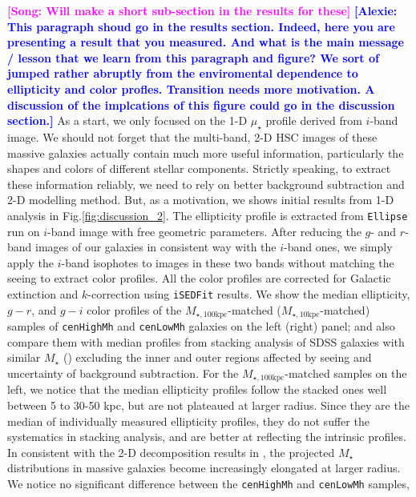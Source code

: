 \documentclass{emulateapj}
\def\rbcg{\texttt{cenHighMh}}
\def\nbcg{\texttt{cenLowMh}}
\def\mstar{{$M_{\star}$}}
\def\minn{{$M_{\star,10\mathrm{kpc}}$}}
\def\mtot{{$M_{\star,100\mathrm{kpc}}$}}
\def\mden{{$\mu_{\star}$}}
\newcommand{\song}[1]{\textcolor{magenta}{\textbf{[Song: #1]}}}
\newcommand{\alexie}[1]{\textcolor{blue}{\textbf{[Alexie: #1]}}}
\begin{document}
\begin{CJK*}{UTF8}{gbsn}
    \song{Will make a short sub-section in the results for these}
\alexie{This paragraph shoud go in the results section. Indeed, here you are presenting a result that you measured. And what is the main message / lesson that we learn from this paragraph and figure? We sort of jumped rather abruptly from the enviromental dependence to ellipticity and color profles. Transition needs more motivation. A discussion of the implcations of this figure could go in the discussion section.}    As a start, we only focused on the 1-D \mden{} profile derived from $i$-band image.  
    We should not forget that the multi-band, 2-D HSC images of these massive galaxies 
    actually contain much more useful information, particularly the shapes and colors 
    of different stellar components.  
    Strictly speaking, to extract these information reliably, we need to rely on better 
    background subtraction and 2-D modelling method.  
    But, as a motivation, we shows initial results from 1-D analysis in 
    Fig.\ref{fig:discussion_2}.  
    The ellipticity profile is extracted from \texttt{Ellipse} run on $i$-band image 
    with free geometric parameters. 
    After reducing the $g$- and $r$-band images of our galaxies in consistent way with 
    the $i$-band ones, we simply apply the $i$-band isophotes to images in these two 
    bands without matching the seeing to extract color profiles. 
    All the color profiles are corrected for Galactic extinction and $k$-correction 
    using \texttt{iSEDFit} results. 
    We show the median ellipticity, $g-r$, and $g-i$ color profiles of the 
    \mtot{}-matched (\minn{}-matched) samples of \rbcg{} and \nbcg{} galaxies on the 
    left (right) panel; and also compare them with median profiles from stacking 
    analysis of SDSS galaxies with similar \mstar{} 
    (\citealt{LaBarbera2010, Tal2011, DSouza2014}) excluding the inner and outer regions 
    affected by seeing and uncertainty of background subtraction.  
    For the \mtot{}-matched samples on the left, we notice that the median ellipticity 
    profiles follow the stacked ones well between 5 to 30-50 kpc, but are not plateaued
    at larger radius.  
    Since they are the median of individually measured ellipticity profiles, they do 
    not suffer the systematics in stacking analysis, and are better at reflecting the 
    intrinsic profiles.  
    In consistent with the 2-D decomposition results in \citep{Huang2013a}, the 
    projected \mstar{} distributions in massive galaxies become increasingly elongated 
    at larger radius.  
    We notice no significant difference between the \rbcg{} and \nbcg{} samples, 

\end{CJK*}
\end{document}
